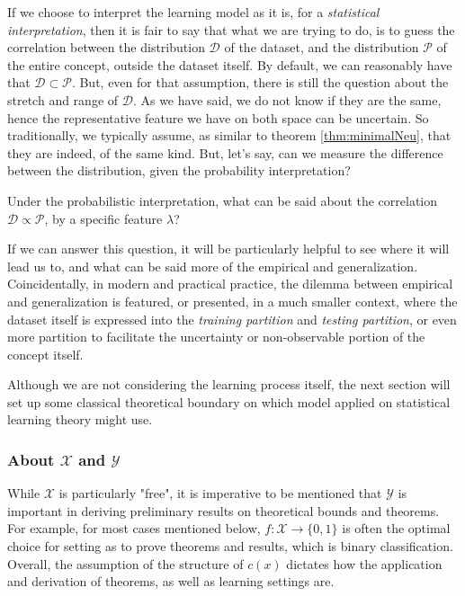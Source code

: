 If we choose to interpret the learning model as it is, for a \textit{statistical interpretation}, then it is fair to say that what we are trying to do, is to guess the correlation between the distribution $\mathcal{D}$ of the dataset, and the distribution $\mathcal{P}$ of the entire concept, outside the dataset itself. By default, we can reasonably have that $\mathcal{D}\subset \mathcal{P}$. But, even for that assumption, there is still the question about the stretch and range of $\mathcal{D}$. As we have said, we do not know if they are the same, hence the representative feature we have on both space can be uncertain. So traditionally, we typically assume, as similar to theorem \ref{thm:minimalNeu}, that they are indeed, of the same kind. But, let's say, can we measure the difference between the distribution, given the probability interpretation? 

\begin{question}
    Under the probabilistic interpretation, what can be said about the correlation $\mathcal{D}\propto \mathcal{P}$, by a specific feature $\lambda$?
\end{question}

If we can answer this question, it will be particularly helpful to see where it will lead us to, and what can be said more of the empirical and generalization. Coincidentally, in modern and practical practice, the dilemma between empirical and generalization is featured, or presented, in a much smaller context, where the dataset itself is expressed into the \textit{training partition} and \textit{testing partition}, or even more partition to facilitate the uncertainty or non-observable portion of the concept itself. 

Although we are not considering the learning process itself, the next section will set up some classical theoretical boundary on which model applied on statistical learning theory might use. 
\subsubsection{About $\mathcal{X}$ and $\mathcal{Y}$}
While $\mathcal{X}$ is particularly "free", it is imperative to be mentioned that $\mathcal{Y}$ is important in deriving preliminary results on theoretical bounds and theorems. For example, for most cases mentioned below, $f: \mathcal{X}\to \{0,1\}$ is often the optimal choice for setting as to prove theorems and results, which is binary classification. Overall, the assumption of the structure of $c(x)$ dictates how the application and derivation of theorems, as well as learning settings are. 

